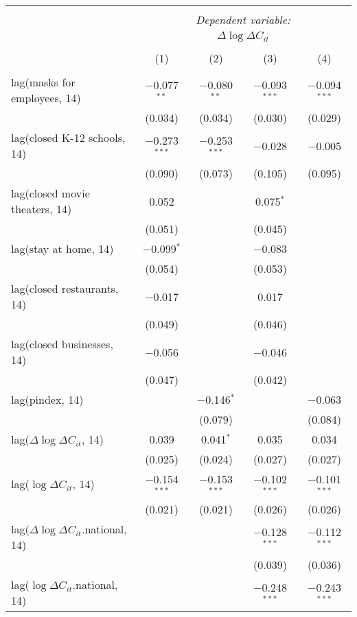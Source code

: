 \begin{tabular}{@{\extracolsep{1pt}}lcccc} 
\\[-1.8ex]\hline 
\hline \\[-1.8ex] 
 & \multicolumn{4}{c}{\textit{Dependent variable:}} \\ 
\cline{2-5} 
 & \multicolumn{4}{c}{$\Delta \log \Delta C_{it}$} \\ 
\\[-1.8ex] & (1) & (2) & (3) & (4)\\ 
\hline \\[-1.8ex] 
 lag(masks for employees, 14) & $-$0.077$^{**}$ & $-$0.080$^{**}$ & $-$0.093$^{***}$ & $-$0.094$^{***}$ \\ 
  & (0.034) & (0.034) & (0.030) & (0.029) \\ 
  lag(closed K-12 schools, 14) & $-$0.273$^{***}$ & $-$0.253$^{***}$ & $-$0.028 & $-$0.005 \\ 
  & (0.090) & (0.073) & (0.105) & (0.095) \\ 
  lag(closed movie theaters, 14) & 0.052 &  & 0.075$^{*}$ &  \\ 
  & (0.051) &  & (0.045) &  \\ 
  lag(stay at home, 14) & $-$0.099$^{*}$ &  & $-$0.083 &  \\ 
  & (0.054) &  & (0.053) &  \\ 
  lag(closed restaurants, 14) & $-$0.017 &  & 0.017 &  \\ 
  & (0.049) &  & (0.046) &  \\ 
  lag(closed businesses, 14) & $-$0.056 &  & $-$0.046 &  \\ 
  & (0.047) &  & (0.042) &  \\ 
  lag(pindex, 14) &  & $-$0.146$^{*}$ &  & $-$0.063 \\ 
  &  & (0.079) &  & (0.084) \\ 
  lag($\Delta \log \Delta C_{it}$, 14) & 0.039 & 0.041$^{*}$ & 0.035 & 0.034 \\ 
  & (0.025) & (0.024) & (0.027) & (0.027) \\ 
  lag($\log \Delta C_{it}$, 14) & $-$0.154$^{***}$ & $-$0.153$^{***}$ & $-$0.102$^{***}$ & $-$0.101$^{***}$ \\ 
  & (0.021) & (0.021) & (0.026) & (0.026) \\ 
  lag($\Delta \log \Delta C_{it}$.national, 14) &  &  & $-$0.128$^{***}$ & $-$0.112$^{***}$ \\ 
  &  &  & (0.039) & (0.036) \\ 
  lag($\log \Delta C_{it}$.national, 14) &  &  & $-$0.248$^{***}$ & $-$0.243$^{***}$ \\ 

\end{tabular}
